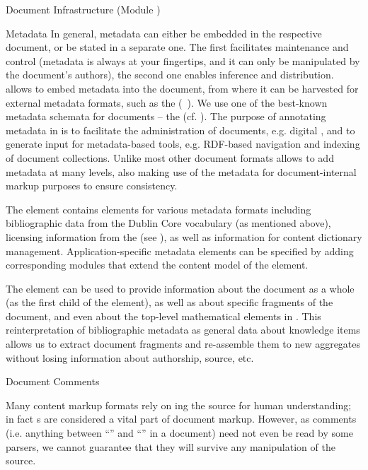\begin{tchapter}[id=omdoc-infrastructure,short=Document Infrastructure]{Document Infrastructure (Module )}
{\begin{tsection}[id=metadata]{Metadata}
  In general, metadata can either be embedded in the respective document, or be stated in
  a separate one. The first facilitates maintenance and control (metadata is always at
  your fingertips, and it can only be manipulated by the document's authors), the second
  one enables inference and distribution. \omdoc allows to embed metadata into the
  document, from where it can be harvested for external metadata formats, such as the
  {\xml} {}
  ({\rdf}~\cite{LasSwi:rdf99}).  We use one of the best-known metadata schemata for
  documents -- the  (cf.  ). The
  purpose of annotating metadata in \omdoc is to facilitate the administration of
  documents, e.g.  digital , and to generate input for
  metadata-based tools, e.g.  RDF-based navigation and indexing of document collections.
  Unlike most other document formats \omdoc allows to add metadata at many levels, also
  making use of the metadata for document-internal markup purposes to ensure consistency.
  
  The  element contains elements for various metadata formats including
  bibliographic data from the Dublin Core vocabulary (as mentioned above), licensing
  information from the  (see
  ), as well as information for {\openmath} content dictionary
  management. Application-specific metadata elements can be specified by adding
  corresponding \omdoc modules that extend the content model of the {}
  element.

  The  element can be used to provide information about the
  document as a whole (as the first child of the  element), as well as
  about specific fragments of the document, and even about the top-level mathematical
  elements in \omdoc. This reinterpretation of bibliographic metadata as general data
  about knowledge items allows us to extract document fragments and re-assemble them to
  new aggregates without losing information about authorship, source, etc.
\end{tsection}

\begin{tsection}[id=comments]{Document Comments}
  
  Many content markup formats rely on {ing} the source for human
  understanding; in fact {s} are considered a vital part of
  document markup. However, as {\xml} comments (i.e. anything between
  ``'' and ``\snippetin{-->}'' in a document) need not even be
  read by some {\xml} parsers, we cannot guarantee that they will
  survive any {\xml} manipulation of the \omdoc source.


\end{tsection}}
\end{tchapter}
